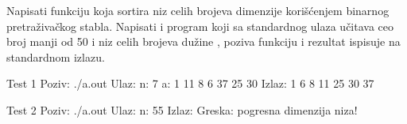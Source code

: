 \begin{Answer}[ref=708]
\end{Answer}


\begin{Exercise}[label=709]
Napisati funkciju  koja sortira niz celih brojeva  dimenzije  korišćenjem binarnog pretraživačkog stabla. Napisati i program koji sa standardnog ulaza učitava ceo broj  manji od 50 i niz  celih brojeva dužine , poziva funkciju  i rezultat ispisuje na standardnom izlazu.  

\begin{miditest}
\begin{test}{Test 1}
Poziv: ./a.out
Ulaz:
	n: 7 
	a: 1 11 8 6 37 25 30
Izlaz:
	1 6 8 11 25 30 37 
\end{test}
\end{miditest}

\begin{maxitest}
\begin{test}{Test 2}
Poziv: ./a.out
Ulaz:
	n: 55 
Izlaz:
	Greska: pogresna dimenzija niza!
\end{test}
\end{maxitest}


\end{Exercise}

\begin{Answer}[ref=709]
\end{Answer}


